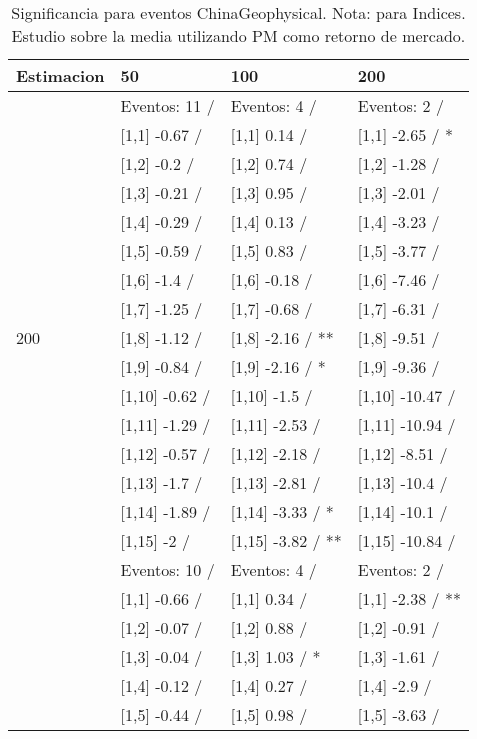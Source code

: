 \begin{table}

\caption{Significancia para eventos ChinaGeophysical. Nota: para Indices. Estudio sobre la media utilizando PM como retorno de mercado.}
\centering
\begin{tabular}[t]{llll}
\toprule
Estimacion & 50 & 100 & 200\\
\midrule
 & Eventos:  11 / & Eventos:  4 / & Eventos:  2 /\\
 & {}[1,1] -0.67  / & {}[1,1] 0.14  / & {}[1,1] -2.65  / *\\
 & {}[1,2] -0.2  / & {}[1,2] 0.74  / & {}[1,2] -1.28  /\\
 & {}[1,3] -0.21  / & {}[1,3] 0.95  / & {}[1,3] -2.01  /\\
 & {}[1,4] -0.29  / & {}[1,4] 0.13  / & {}[1,4] -3.23  /\\
\addlinespace
 & {}[1,5] -0.59  / & {}[1,5] 0.83  / & {}[1,5] -3.77  /\\
 & {}[1,6] -1.4  / & {}[1,6] -0.18  / & {}[1,6] -7.46  /\\
 & {}[1,7] -1.25  / & {}[1,7] -0.68  / & {}[1,7] -6.31  /\\
200 & {}[1,8] -1.12  / & {}[1,8] -2.16  / ** & {}[1,8] -9.51  /\\
 & {}[1,9] -0.84  / & {}[1,9] -2.16  / * & {}[1,9] -9.36  /\\
\addlinespace
 & {}[1,10] -0.62  / & {}[1,10] -1.5  / & {}[1,10] -10.47  /\\
 & {}[1,11] -1.29  / & {}[1,11] -2.53  / & {}[1,11] -10.94  /\\
 & {}[1,12] -0.57  / & {}[1,12] -2.18  / & {}[1,12] -8.51  /\\
 & {}[1,13] -1.7  / & {}[1,13] -2.81  / & {}[1,13] -10.4  /\\
 & {}[1,14] -1.89  / & {}[1,14] -3.33  / * & {}[1,14] -10.1  /\\
\addlinespace
 & {}[1,15] -2  / & {}[1,15] -3.82  / ** & {}[1,15] -10.84  /\\
 & Eventos:  10 / & Eventos:  4 / & Eventos:  2 /\\
 & {}[1,1] -0.66  / & {}[1,1] 0.34  / & {}[1,1] -2.38  / **\\
 & {}[1,2] -0.07  / & {}[1,2] 0.88  / & {}[1,2] -0.91  /\\
 & {}[1,3] -0.04  / & {}[1,3] 1.03  / * & {}[1,3] -1.61  /\\
\addlinespace
 & {}[1,4] -0.12  / & {}[1,4] 0.27  / & {}[1,4] -2.9  /\\
 & {}[1,5] -0.44  / & {}[1,5] 0.98  / & {}[1,5] -3.63  /\\

\end{tabular}
\end{table}
